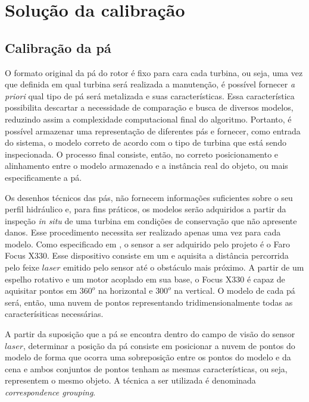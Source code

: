 \section{Solução da calibração}

\subsection{Calibração da pá}

O formato original da pá do rotor é fixo para cara cada turbina, ou seja, uma
vez que definida em qual turbina será realizada a manutenção, é possível
fornecer \textit{a priori} qual tipo de pá será metalizada e suas
características. Essa característica possibilita descartar a necessidade de comparação e busca de
diversos modelos, reduzindo assim a complexidade computacional final do
algoritmo. Portanto, é possível armazenar uma representação de diferentes pás e
fornecer, como entrada do sistema, o modelo correto de acordo com o tipo de turbina que
está sendo inspecionada. O processo final consiste, então, no correto
posicionamento e alinhamento entre o modelo armazenado e a instância real do
objeto, ou mais especificamente a pá.

Os desenhos técnicos das pás, não fornecem informações suficientes
sobre o seu perfil hidráulico e, para fins práticos, os modelos serão adquiridos
a partir da inspeção \textit{in situ} de uma turbina em condições de conservação
que não apresente danos. Esse procedimento necessita ser realizado apenas uma
vez para cada modelo. Como especificado em \cite{EMMA DETAIL}, %
o sensor a ser adquirido pelo projeto é o Faro Focus X330. Esse dispositivo
consiste em um  e aquisita a distância percorrida pelo
feixe $laser$ emitido pelo sensor até o obstáculo mais próximo. A partir de um
espelho rotativo e um motor acoplado em sua base, o Focus X330 é capaz de
aquisitar pontos em $360^o$ na horizontal e $300^o$ na vertical. O modelo de
cada pá será, então, uma nuvem de pontos representando tridimensionalmente todas
as caracterísiticas necessárias.

A partir da suposição que a pá se encontra dentro do campo de visão do sensor
$laser$, determinar a posição da pá consiste em posicionar a nuvem de pontos do
modelo de forma que ocorra uma sobreposição entre os pontos do modelo e da cena
e ambos conjuntos de pontos tenham as mesmas características, ou seja,
representem o mesmo objeto. A técnica a ser utilizada é denominada
\textit{correspondence grouping}. 


